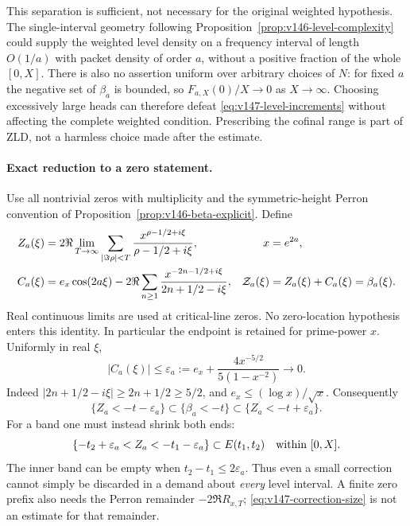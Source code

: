 This separation is sufficient, not necessary for the original weighted
hypothesis. The single-interval geometry following
Proposition~\ref{prop:v146-level-complexity} could supply the weighted
level density on a frequency interval of length $O(1/a)$ with packet
density of order $a$, without a positive fraction of the whole $[0,X]$.
There is also no assertion uniform over arbitrary choices of $N$:
for fixed $a$ the negative set of $\beta_a$ is bounded, so
$F_{a,X}(0)/X\to0$ as $X\to\infty$. Choosing excessively large
heads can therefore defeat \eqref{eq:v147-level-increments} without
affecting the complete weighted condition. Prescribing the cofinal
range is part of ZLD, not a harmless choice made after the estimate.

\paragraph{Exact reduction to a zero statement.}
Use all nontrivial zeros with multiplicity and the symmetric-height
Perron convention of Proposition~\ref{prop:v146-beta-explicit}. Define
\begin{align}
 Z_a(\xi)&=2\Re\lim_{T\to\infty}
       \sum_{|\Im\rho|<T}\frac{x^{\rho-1/2+i\xi}}{\rho-1/2+i\xi},
 &x&=e^{2a}, \notag\\
 C_a(\xi)&=e_x\cos(2a\xi)
       -2\Re\sum_{n\ge1}\frac{x^{-2n-1/2+i\xi}}{2n+1/2-i\xi},
 &\mathcal Z_a(\xi)&=Z_a(\xi)+C_a(\xi)=\beta_a(\xi).
 \label{eq:v147-corrected-zero-field}
\end{align}
Real continuous limits are used at critical-line zeros. No zero-location
hypothesis enters this identity. In particular the endpoint is retained
for prime-power $x$. Uniformly in real $\xi$,
\begin{equation}\label{eq:v147-correction-size}
 |C_a(\xi)|\le\varepsilon_a:=
 e_x+\frac{4x^{-5/2}}{5(1-x^{-2})}\longrightarrow0.
\end{equation}
Indeed $|2n+1/2-i\xi|\ge2n+1/2\ge5/2$, and
$e_x\le(\log x)/\sqrt x$. Consequently
\[
 \{Z_a<-t-\varepsilon_a\}\subset\{\beta_a<-t\}
 \subset\{Z_a<-t+\varepsilon_a\}.
\]
For a band one must instead shrink both ends:
\[
 \{-t_2+\varepsilon_a<Z_a<-t_1-\varepsilon_a\}
 \subset E(t_1,t_2)
 \quad\hbox{within }[0,X].
\]
The inner band can be empty when $t_2-t_1\le2\varepsilon_a$.
Thus even a small correction cannot simply be discarded in a demand
about \emph{every} level interval. A finite zero prefix also needs the
Perron remainder $-2\Re R_{x,T}$; \eqref{eq:v147-correction-size} is
not an estimate for that remainder.

